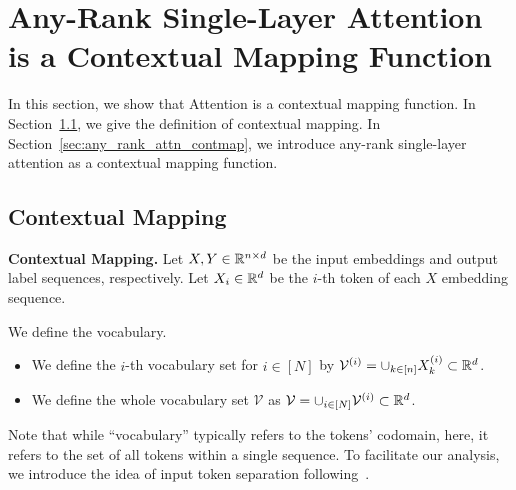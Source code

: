 
\section{Any-Rank Single-Layer Attention is a Contextual Mapping Function}
\label{sec:context_map}
In this section, we show that Attention is a contextual mapping function. 
In Section~\ref{sec:cont_map}, we give the definition of contextual mapping.
In Section~\ref{sec:any_rank_attn_contmap}, we introduce any-rank single-layer attention as a contextual mapping function. 



\subsection{Contextual Mapping}\label{sec:cont_map}


{\bf Contextual Mapping.}
Let $X, Y \in \mathbb{R}^{n\times d}$ be the input embeddings and output label sequences, respectively. 
Let $X_{i} \in \mathbb{R}^{d}$ be the $i$-th token of each $X$ embedding sequence. 

\begin{definition}\label{def:vocab}
    We define the vocabulary.
    \begin{itemize}
        \item We define the $i$-th vocabulary set for $i \in [N]$ by $\mathcal{V}^{(i)}=\cup_{k \in[n]} X_k^{(i)} \subset \mathbb{R}^{d}$.
        \item We define the whole vocabulary set $\mathcal{V}$ as $\mathcal{V}=\cup_{i \in[N]} \mathcal{V}^{(i)} \subset \mathbb{R}^{d}$.
    \end{itemize}
\end{definition}
Note that while ``vocabulary'' typically refers to the tokens' codomain, here, it refers to the set of all tokens within a single sequence.
To facilitate our analysis, 
we introduce the idea of input token separation following~\cite{ks24,kkm22,ybr+20}.

